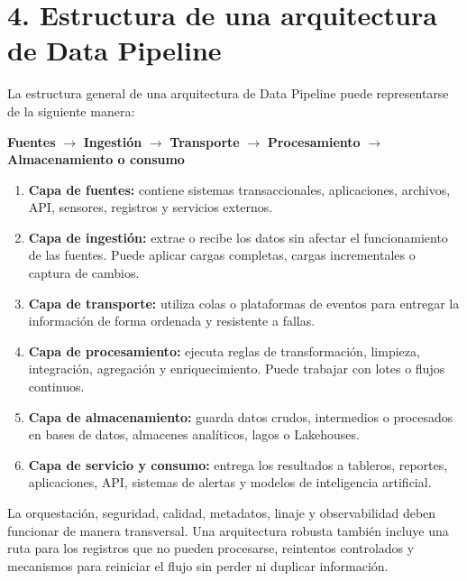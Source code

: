 \section*{4. Estructura de una arquitectura de Data Pipeline}

La estructura general de una arquitectura de Data Pipeline puede representarse
de la siguiente manera:

\begin{center}
\textbf{Fuentes} $\longrightarrow$ \textbf{Ingestión}
$\longrightarrow$ \textbf{Transporte}
$\longrightarrow$ \textbf{Procesamiento}
$\longrightarrow$ \textbf{Almacenamiento o consumo}
\end{center}

\begin{enumerate}
    \item \textbf{Capa de fuentes:} contiene sistemas transaccionales,
    aplicaciones, archivos, API, sensores, registros y servicios externos.

    \item \textbf{Capa de ingestión:} extrae o recibe los datos sin afectar el
    funcionamiento de las fuentes. Puede aplicar cargas completas, cargas
    incrementales o captura de cambios.

    \item \textbf{Capa de transporte:} utiliza colas o plataformas de eventos
    para entregar la información de forma ordenada y resistente a fallas.

    \item \textbf{Capa de procesamiento:} ejecuta reglas de transformación,
    limpieza, integración, agregación y enriquecimiento. Puede trabajar con
    lotes o flujos continuos.

    \item \textbf{Capa de almacenamiento:} guarda datos crudos, intermedios o
    procesados en bases de datos, almacenes analíticos, lagos o Lakehouses.

    \item \textbf{Capa de servicio y consumo:} entrega los resultados a
    tableros, reportes, aplicaciones, API, sistemas de alertas y modelos de
    inteligencia artificial.
\end{enumerate}

La orquestación, seguridad, calidad, metadatos, linaje y observabilidad deben
funcionar de manera transversal. Una arquitectura robusta también incluye una
ruta para los registros que no pueden procesarse, reintentos controlados y
mecanismos para reiniciar el flujo sin perder ni duplicar información.

